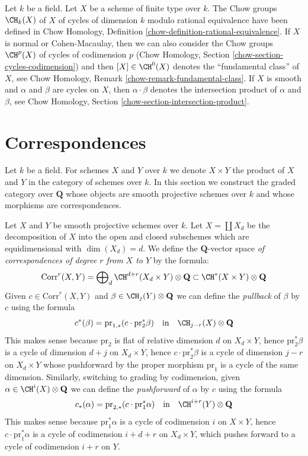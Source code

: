\medskip\noindent
Let $k$ be a field. Let $X$ be a scheme of finite type over $k$.
The Chow groups $\CH_k(X)$ of $X$ of cycles of dimension $k$
modulo rational equivalence have been defined in
Chow Homology, Definition \ref{chow-definition-rational-equivalence}.
If $X$ is normal or Cohen-Macaulay, then we can also consider
the Chow groups $\CH^p(X)$ of cycles of codimension $p$
(Chow Homology, Section \ref{chow-section-cycles-codimension})
and then $[X] \in \CH^0(X)$ denotes the ``fundamental class'' of $X$, see
Chow Homology, Remark \ref{chow-remark-fundamental-class}.
If $X$ is smooth and $\alpha$ and $\beta$ are cycles on $X$,
then $\alpha \cdot \beta$ denotes the intersection product of
$\alpha$ and $\beta$, see
Chow Homology, Section \ref{chow-section-intersection-product}.













\section{Correspondences}
\label{section-correspondences}

\noindent
Let $k$ be a field. For schemes $X$ and $Y$ over $k$ we denote
$X \times Y$ the product of $X$ and $Y$ in the category of schemes
over $k$. In this section we construct the graded category over
$\mathbf{Q}$ whose objects are smooth projective schemes over $k$ and whose
morphisms are correspondences.

\medskip\noindent
Let $X$ and $Y$ be smooth projective schemes over $k$.
Let $X = \coprod X_d$ be the decomposition of $X$ into
the open and closed subschemes which are equidimensional
with $\dim(X_d) = d$. We define the $\mathbf{Q}$-vector space
{\it of correspondences of degree $r$ from $X$ to $Y$}
by the formula:
$$
\text{Corr}^r(X, Y) =
\bigoplus\nolimits_d \CH^{d + r}(X_d \times Y) \otimes \mathbf{Q}
\subset
\CH^*(X \times Y) \otimes \mathbf{Q}
$$
Given $c \in \text{Corr}^r(X, Y)$ and $\beta \in \CH_j(Y) \otimes \mathbf{Q}$
we can define the {\it pullback} of $\beta$ by $c$ using the formula
$$
c^*(\beta) = \text{pr}_{1, *}(c \cdot \text{pr}_2^*\beta)
\quad\text{in}\quad
\CH_{j - r}(X) \otimes \mathbf{Q}
$$
This makes sense because $\text{pr}_2$ is flat of relative dimension
$d$ on $X_d \times Y$, hence $\text{pr}_2^*\beta$ is a cycle of
dimension $d + j$ on $X_d \times Y$, hence $c \cdot \text{pr}_2^*\beta$
is a cycle of dimension $j - r$ on $X_d \times Y$ whose pushforward
by the proper morphism $\text{pr}_1$ is a cycle of the same dimension.
Similarly, switching to grading by codimension,
given $\alpha \in \CH^i(X) \otimes \mathbf{Q}$ we can define the
{\it pushforward} of $\alpha$ by $c$ using the formula
$$
c_*(\alpha) = \text{pr}_{2, *}(c \cdot \text{pr}_1^*\alpha)
\quad\text{in}\quad
\CH^{i + r}(Y) \otimes \mathbf{Q}
$$
This makes sense because $\text{pr}_1^*\alpha$ is a cycle of codimension
$i$ on $X \times Y$, hence $c \cdot \text{pr}_1^*\alpha$ is a cycle
of codimension $i + d + r$ on $X_d \times Y$, which pushes forward
to a cycle of codimension $i + r$ on $Y$.

